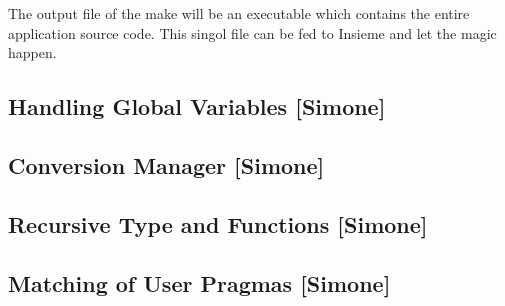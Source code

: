 The output file of the make will be an executable which contains the entire
application source code. This singol file can be fed to Insieme and let the
magic happen.

\subsection{Handling Global Variables [Simone]}
\label{sec:Insieme.Frontend.Global}

\subsection{Conversion Manager [Simone]}
\label{sec:Insieme.Convert}

\subsection{Recursive Type and Functions [Simone]}
\label{sec:Insieme.Recursion}

\subsection{Matching of User Pragmas [Simone]}
\label{sec:Insieme.Pragmas}






